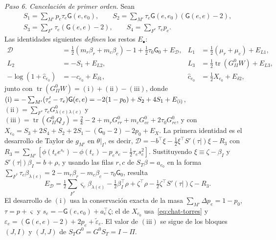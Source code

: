 \emph{Paso 6. Cancelación de primer orden.} Sean
\begin{gather*}
 S_1=\sum_{M'}p_e\tau_e\mathsf G(e,e_0),\qquad
 S_2=\sum_{M'}\tau_e\mathsf G(e,e_0)(\mathsf G(e,e)-2),\\
 S_3=\sum_{F^*}\tau_e(\mathsf G(e,e)-2),\qquad S_4=\sum_{F^*}\tau_ep_e .
\end{gather*}
Las identidades siguientes \emph{definen} los restos $E_\bullet$:
\begin{align*}
 \mathcal D&=\tfrac12(m_r\beta_r+m_c\beta_c)-1+\tfrac12\tau_0\mathsf G_0+E_{\mathcal D}, &
 L_1&=\tfrac12(\mu_r+\mu_c)+E_{L1},\\
 L_2&=-S_1+E_{L2}, &
 L_3&=\tfrac12\operatorname{tr}(G^0_{II}W)+E_{L3},\\
 -\log(1+\hat c_{e_0})&=-\hat c_{e_0}+E_{\delta1}, &
 \hat c_{e_0}&=\tfrac12X_{e_0}+E_{\delta2},
\end{align*}
junto con $\operatorname{tr}(G^0_{II}W)=\mathrm{(i)}+\mathrm{(ii)}-\mathrm{(iii)}$, donde
$\mathrm{(i)}=-\sum_{M'}(\tau'_e-\tau_e)\mathsf G(e,e)=-2(1-p_0)+S_2+4S_1+E_{\rm(i)}$,
$\mathrm{(ii)}=\sum_{F^*}\tau_eG^0_{\lambda(e)\lambda(e)}$ y
$\mathrm{(iii)}=\operatorname{tr}(G^0_{II}Q_J)=\tfrac2k-2+m_rG^0_{rr}+m_cG^0_{cc}+2\tau_0G^0_{rc}$, y
con $X_{e_0}=S_3+2S_4+S_2+2S_1-(\mathsf G_0-2)-2p_0+E_X$. La primera identidad es el desarrollo de
Taylor de $g_{M'}$ en $\theta|_I$, es decir, $\mathcal D=-b^\top\xi-\tfrac12\xi^\top S'(\tau|)\xi-R_3$
con $R_3=\sum_{M'}[\phi(t_ee^{s_e})-\phi(t_e)-p_es_e-\tfrac12\tau_es_e^2]$. Sustituyendo
$\xi\equiv\zeta-\beta_I$ y $S'(\tau|)\beta_I=b+\rho$, y usando las filas $r,c$ de
$S_T\beta=a_{e_0}$ en la forma $\sum_{F^*}\tau_e\beta_{\lambda(e)}=2-m_r\beta_r-m_c\beta_c-\tau_0\mathsf
G_0$, resulta
\[
 E_{\mathcal D}=\tfrac12\sum_{F^*}\varsigma_e\beta_{\lambda(e)}-\tfrac12\beta_I^\top\rho+\zeta^\top\rho
   -\tfrac12\zeta^\top S'(\tau|)\zeta-R_3 .
\]
El desarrollo de $\mathrm{(i)}$ usa la conservación exacta de la masa $\sum_{M'}\Delta p_e=1-p_0$,
$\tau=p+\varsigma$ y $s_e=-\mathsf G(e,e_0)+a_e^\top\zeta$; el de $X_{e_0}$
usa~\eqref{eq:chat-torres} y $\varepsilon_e=(\mathsf G(e,e)-2)+2p_e+\tilde\varepsilon_e$. El valor de
$\mathrm{(iii)}$ se sigue de los bloques $(J,I)$ y $(J,J)$ de $S_TG^0=G^0S_T=I-\Pi$.

